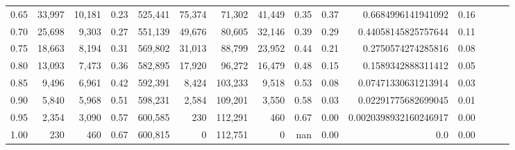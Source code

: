 \begin{tabular}{rrrrrrrrrrrrrrr}
0.65 &  33,997 &  10,181 &  0.23 &  525,441 &   75,374 &   71,302 &   41,449 &  0.35 &  0.37 &     0.6684996141941092 &      0.16 \\
0.70 &  25,698 &   9,303 &  0.27 &  551,139 &   49,676 &   80,605 &   32,146 &  0.39 &  0.29 &    0.44058145825757644 &      0.11 \\
0.75 &  18,663 &   8,194 &  0.31 &  569,802 &   31,013 &   88,799 &   23,952 &  0.44 &  0.21 &     0.2750574274285816 &      0.08 \\
0.80 &  13,093 &   7,473 &  0.36 &  582,895 &   17,920 &   96,272 &   16,479 &  0.48 &  0.15 &     0.1589342888311412 &      0.05 \\
0.85 &   9,496 &   6,961 &  0.42 &  592,391 &    8,424 &  103,233 &    9,518 &  0.53 &  0.08 &    0.07471330631213914 &      0.03 \\
0.90 &   5,840 &   5,968 &  0.51 &  598,231 &    2,584 &  109,201 &    3,550 &  0.58 &  0.03 &    0.02291775682699045 &      0.01 \\
0.95 &   2,354 &   3,090 &  0.57 &  600,585 &      230 &  112,291 &      460 &  0.67 &  0.00 &  0.0020398932160246917 &      0.00 \\
1.00 &     230 &     460 &  0.67 &  600,815 &        0 &  112,751 &        0 &   nan &  0.00 &                    0.0 &      0.00 \\
\bottomrule
\end{tabular}
